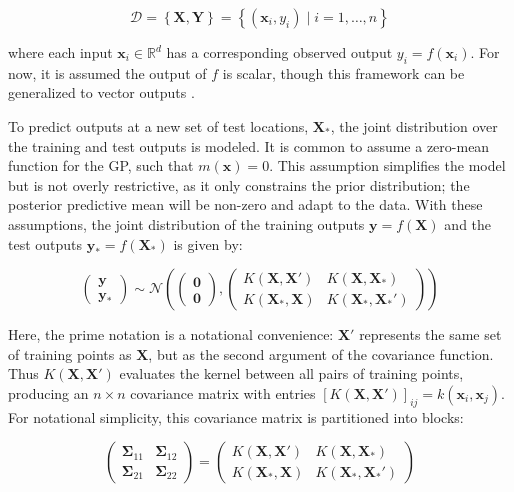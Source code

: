 \documentclass[12pt]{article}
\begin{document}
\begin{equation}
	\label{data_set}
	\mathcal{D} = \left\{\mathbf{X}, \mathbf{Y} \right\}  = \left\{(\mathbf{x}_i, y_i) \mid i = 1, \ldots, n \right\}
\end{equation}

where each input $\mathbf{x}_i \in \mathbb{R}^d$ has a corresponding observed output $y_i = f(\mathbf{x}_i)$. For now, it is assumed the output of $f$ is scalar, though this framework can be generalized to vector outputs \cite{LIU2018102,Lin2022-rs}.

To predict outputs at a new set of test locations, $\mathbf{X}_*$, the joint distribution over the training and test outputs is modeled. It is common to assume a zero-mean function for the GP, such that $m(\mathbf{x}) = 0$. This assumption simplifies the model but is not overly restrictive, as it only constrains the prior distribution; the posterior predictive mean will be non-zero and adapt to the data. With these assumptions, the joint distribution of the training outputs $\mathbf{y} = f(\mathbf{X})$ and the test outputs $\mathbf{y}_* = f(\mathbf{X}_*)$ is given by:

\begin{equation}
	\label{eqn_joint_dist}
	\begin{pmatrix}
		\mathbf{y} \\
		\mathbf{y}_*
	\end{pmatrix}
	\sim \mathcal{N}\left(
	\begin{pmatrix}
		\mathbf{0} \\
		\mathbf{0}
	\end{pmatrix},
	\begin{pmatrix}
		K(\mathbf{X}, \mathbf{X}') & K(\mathbf{X}, \mathbf{X}_*) \\
		K(\mathbf{X}_*, \mathbf{X}) & K(\mathbf{X}_*, \mathbf{X}_*')
	\end{pmatrix}
	\right)
\end{equation}

Here, the prime notation is a notational convenience: $\mathbf{X}'$ represents the same set of training points as $\mathbf{X}$, but as the second argument of the covariance function. Thus $K(\mathbf{X}, \mathbf{X}')$ evaluates the kernel between all pairs of training points, producing an $n \times n$ covariance matrix with entries $[K(\mathbf{X}, \mathbf{X}')]_{ij} = k(\mathbf{x}_i, \mathbf{x}_j)$. For notational simplicity, this covariance matrix is partitioned into blocks:

\begin{equation}
	\label{eqn_cov_blocks}
	\begin{pmatrix}
		\boldsymbol{\Sigma}_{11} & \boldsymbol{\Sigma}_{12} \\
		\boldsymbol{\Sigma}_{21} & \boldsymbol{\Sigma}_{22}
	\end{pmatrix}
	=
	\begin{pmatrix}
		K(\mathbf{X}, \mathbf{X}') & K(\mathbf{X}, \mathbf{X}_*) \\
		K(\mathbf{X}_*, \mathbf{X}) & K(\mathbf{X}_*, \mathbf{X}_*')
	\end{pmatrix}
\end{equation}
\end{document}
